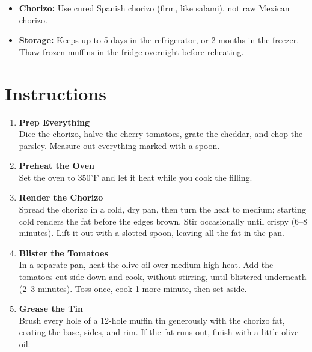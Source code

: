 \begin{itemize}
      \item \textbf{Chorizo:} Use cured Spanish chorizo (firm, like salami), not raw Mexican chorizo.
      \item \textbf{Storage:} Keeps up to 5 days in the refrigerator, or 2 months in the freezer. Thaw frozen muffins in the fridge overnight before reheating.
\end{itemize}

\newpage
{}
\section*{Instructions}

\begin{enumerate}

      \item \textbf{Prep Everything} \\
            Dice the chorizo, halve the cherry tomatoes, grate the cheddar, and chop the
            parsley. Measure out everything marked with a spoon.

      \item \textbf{Preheat the Oven} \\
            Set the oven to 350$^\circ$F and let it heat while you cook the filling.

      \item \textbf{Render the Chorizo} \\
            Spread the chorizo in a cold, dry pan, then turn the heat to medium; starting cold
            renders the fat before the edges brown. Stir occasionally until crispy (6--8 minutes).
            Lift it out with a slotted spoon, leaving all the fat in the pan.

      \item \textbf{Blister the Tomatoes} \\
            In a separate pan, heat the olive oil over medium-high heat. Add the tomatoes
            cut-side down and cook, without stirring, until blistered underneath (2--3 minutes).
            Toss once, cook 1 more minute, then set aside.

      \item \textbf{Grease the Tin} \\
            Brush every hole of a 12-hole muffin tin generously with the chorizo fat, coating the
            base, sides, and rim. If the fat runs out, finish with a little olive oil.


\end{enumerate}
